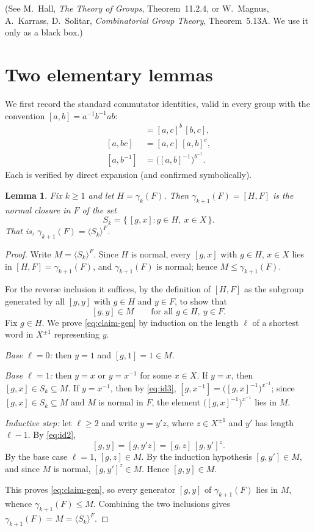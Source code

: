 \documentclass{amsart}
\newtheorem{lemma}{Lemma}
\theoremstyle{definition}
\theoremstyle{remark}
\begin{document}
\noindent
(See M.~Hall, \emph{The Theory of Groups}, Theorem~11.2.4, or
W.~Magnus, A.~Karrass, D.~Solitar, \emph{Combinatorial Group Theory},
Theorem~5.13A. We use it only as a black box.)

\section{Two elementary lemmas}

We first record the standard commutator identities, valid in every group with the
convention $[a,b]=a^{-1}b^{-1}ab$:
\begin{align}
[ab,c]&=[a,c]^{b}\,[b,c], \label{eq:id1}\\
[a,bc]&=[a,c]\,[a,b]^{c}, \label{eq:id2}\\
[a,b^{-1}]&=\big([a,b]^{-1}\big)^{b^{-1}}. \label{eq:id3}
\end{align}
Each is verified by direct expansion (and confirmed symbolically).

\begin{lemma}\label{lem:gen}
Fix $k\ge 1$ and let $H=\gamma_k(F)$. Then $\gamma_{k+1}(F)=[H,F]$ is the normal
closure in $F$ of the set
\[
S_k=\{\,[g,x] : g\in H,\ x\in X\,\}.
\]
That is, $\gamma_{k+1}(F)=\langle S_k\rangle^{F}$.
\end{lemma}

\begin{proof}
Write $M=\langle S_k\rangle^{F}$. Since $H$ is normal, every $[g,x]$ with $g\in H$,
$x\in X$ lies in $[H,F]=\gamma_{k+1}(F)$, and $\gamma_{k+1}(F)$ is normal; hence
$M\le\gamma_{k+1}(F)$.

For the reverse inclusion it suffices, by the definition of $[H,F]$ as the subgroup
generated by all $[g,y]$ with $g\in H$ and $y\in F$, to show that
\begin{equation}\label{eq:claim-gen}
[g,y]\in M\qquad\text{for all } g\in H,\ y\in F.
\end{equation}
Fix $g\in H$. We prove \eqref{eq:claim-gen} by induction on the length $\ell$ of a
shortest word in $X^{\pm1}$ representing $y$.

\emph{Base $\ell=0$:} then $y=1$ and $[g,1]=1\in M$.

\emph{Base $\ell=1$:} then $y=x$ or $y=x^{-1}$ for some $x\in X$. If $y=x$, then
$[g,x]\in S_k\subseteq M$. If $y=x^{-1}$, then by \eqref{eq:id3},
$[g,x^{-1}]=\big([g,x]^{-1}\big)^{x^{-1}}$; since $[g,x]\in S_k\subseteq M$ and $M$ is
normal in $F$, the element $\big([g,x]^{-1}\big)^{x^{-1}}$ lies in $M$.

\emph{Inductive step:} let $\ell\ge 2$ and write $y=y'z$, where $z\in X^{\pm1}$ and
$y'$ has length $\ell-1$. By \eqref{eq:id2},
\[
[g,y]=[g,y'z]=[g,z]\,[g,y']^{z}.
\]
By the base case $\ell=1$, $[g,z]\in M$. By the induction hypothesis
$[g,y']\in M$, and since $M$ is normal, $[g,y']^{z}\in M$. Hence $[g,y]\in M$.

This proves \eqref{eq:claim-gen}, so every generator $[g,y]$ of $\gamma_{k+1}(F)$
lies in $M$, whence $\gamma_{k+1}(F)\le M$. Combining the two inclusions gives
$\gamma_{k+1}(F)=M=\langle S_k\rangle^{F}$.
\end{proof}
\end{document}
